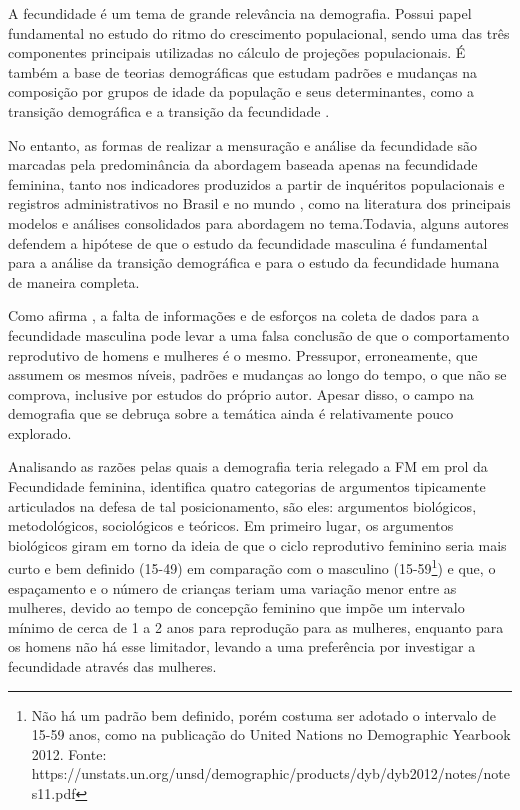 

A fecundidade é um tema de grande relevância na demografia. Possui papel fundamental no estudo do ritmo do crescimento populacional, sendo uma das três componentes principais utilizadas no cálculo de projeções populacionais. É também a base de teorias demográficas que estudam padrões e mudanças na composição por grupos de idade da população e seus determinantes, como a transição demográfica \cite{FOZ2021metodos} e a transição da fecundidade \cite{mason1997explaining}.

No entanto, as formas de realizar a mensuração e análise da fecundidade são marcadas pela predominância da abordagem baseada apenas na fecundidade feminina, tanto nos indicadores produzidos a partir de inquéritos populacionais e registros administrativos no Brasil \cite{rede2002indicadores} e no mundo \cite{united2014principles, unies2004handbook}, como na literatura dos principais modelos e análises consolidados para abordagem no tema.Todavia, alguns autores \cite{zhang2010male, schoumaker2019male, joyner2012quality, paget1994relational, daumler2016men, dudel2019estimating} defendem a hipótese de que o estudo da fecundidade masculina é fundamental para a análise da transição demográfica e para o estudo da fecundidade humana de maneira completa.

Como afirma , a falta de informações e de esforços na coleta de dados para a fecundidade masculina pode levar a uma falsa conclusão de que o comportamento reprodutivo de homens e mulheres é o mesmo. Pressupor, erroneamente, que assumem os mesmos níveis, padrões e mudanças ao longo do tempo, o que não se comprova, inclusive por estudos do próprio autor. Apesar disso, o campo na demografia que se debruça sobre a temática ainda é relativamente pouco explorado.

Analisando as razões pelas quais a demografia teria relegado a FM em prol da Fecundidade feminina,  identifica quatro categorias de argumentos tipicamente articulados na defesa de tal posicionamento, são eles: argumentos biológicos, metodológicos, sociológicos e teóricos. Em primeiro lugar, os argumentos biológicos giram em torno da ideia de que o ciclo reprodutivo feminino seria mais curto e bem definido (15-49) em comparação com o masculino (15-59\footnote{Não há um padrão bem definido, porém costuma ser adotado o intervalo de 15-59 anos, como na publicação do United Nations no Demographic Yearbook 2012. Fonte: https://unstats.un.org/unsd/demographic/products/dyb/dyb2012/notes/notes11.pdf}) e que, o espaçamento e o número de crianças teriam uma variação menor entre as mulheres, devido ao tempo de concepção feminino que impõe um intervalo mínimo de cerca de 1 a 2 anos para reprodução para as mulheres, enquanto para os homens não há esse limitador, levando a uma preferência por investigar a fecundidade através das mulheres. 

